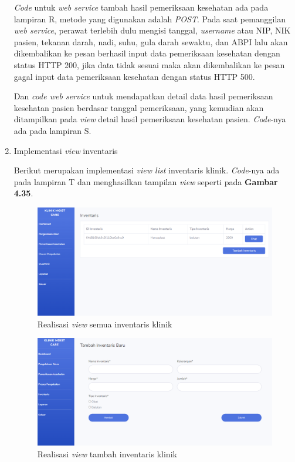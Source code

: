 \begin{enumerate}
	\emph{Code} untuk \emph{web service} tambah hasil pemeriksaan kesehatan ada pada lampiran R, metode yang digunakan adalah \emph{POST}. Pada saat pemanggilan \emph{web service}, perawat terlebih dulu mengisi tanggal, \emph{username} atau NIP, NIK pasien, tekanan darah, nadi, suhu, gula darah sewaktu, dan ABPI lalu akan dikembalikan ke pesan berhasil input data pemeriksaan kesehatan dengan status HTTP 200, jika data tidak sesuai maka akan dikembalikan ke pesan gagal input data pemeriksaan kesehatan dengan status HTTP 500.

	Dan \emph{code web service} untuk mendapatkan detail data hasil pemeriksaan kesehatan pasien berdasar tanggal pemeriksaan, yang kemudian akan ditampilkan pada \emph{view} detail hasil pemeriksaan kesehatan pasien. \emph{Code}-nya ada pada lampiran S.
	
	\item Implementasi \emph{view} inventaris
	
	Berikut merupakan implementasi \emph{view list} inventaris klinik. \emph{Code}-nya ada pada lampiran T dan menghasilkan tampilan \emph{view} seperti pada \textbf{Gambar 4.35}.
	
	\begin{figure}[H]
		\centering
		\includegraphics[width=14cm]{gambar/inventaris_view.png}
		\caption{Realisasi \emph{view} semua inventaris klinik} 
		\label{Gambar:usecaseadminjurnalpertama}
	\end{figure}
	
	\begin{figure}[H]
		\centering
		\includegraphics[width=14cm]{gambar/tambah_inventaris_view.png}
		\caption{Realisasi \emph{view} tambah inventaris klinik} 
		\label{Gambar:usecaseadminjurnalpertama}
	\end{figure}
	

\end{enumerate}
